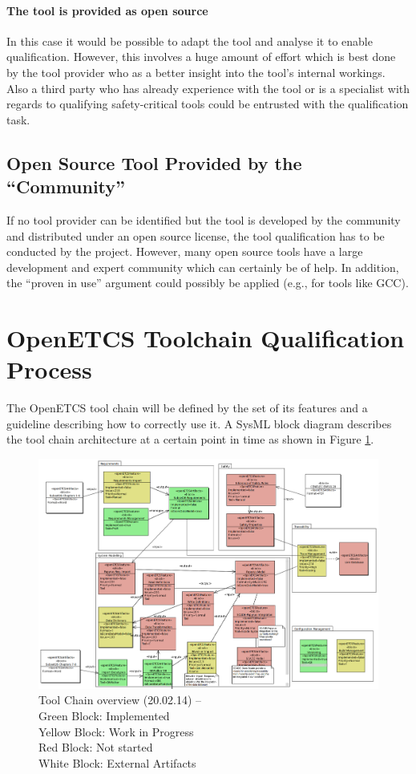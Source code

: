 \paragraph{The tool is provided as open source}

In this case it would be possible to adapt the tool and analyse it to enable qualification. However, this involves a huge amount of effort which is best done by the tool provider who as a better insight into the tool's internal workings. Also a third party who has already experience with the tool or is a specialist with regards to qualifying safety-critical tools could be entrusted with the qualification task.

\subsection{Open Source Tool Provided by the ``Community''}

If no tool provider can be identified but the tool is developed by the community and distributed under an open source license, the tool qualification has to be conducted by the project. However, many open source tools have a large development and expert community which can certainly be of help. In addition, the ``proven in use'' argument could possibly be applied (e.g., for tools like GCC).


\section{OpenETCS Toolchain Qualification Process}
\label{sec:toolchain-qualification-process}

The OpenETCS tool chain  will be defined by the set of its features and
a guideline describing how to correctly use it.
A SysML block diagram describes the tool chain architecture at a certain point in time as shown in
Figure \ref{fig:overview}. 
\begin{figure}[htbp]
\includegraphics[width=\textwidth]{ToolChainmodel}
\caption{\label{fig:overview} Tool Chain overview (20.02.14) -- \\
  Green Block: Implemented \\
  Yellow Block: Work in Progress \\
  Red Block: Not started \\
  White Block: External Artifacts} 
\end{figure}

